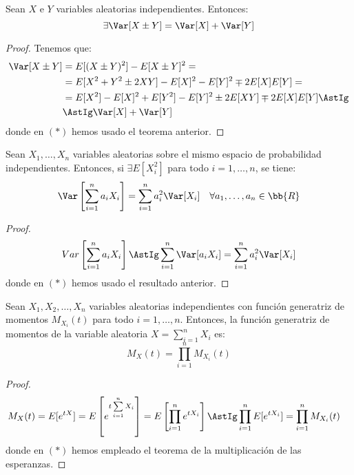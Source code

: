 \begin{coro}
    Sean $X$ e $Y$ variables aleatorias independientes. Entonces:
    \begin{equation*}
        \exists  \Var[X\pm Y] = \Var[X] + \Var[Y]
    \end{equation*}
\end{coro}
\begin{proof}
    Tenemos que:
    \begin{align*}
        \Var[X \pm Y] &= E[(X\pm Y)^2] - E[X\pm Y]^2
        =\\&= E[X^2 + Y^2 \pm 2XY] - E[X]^2 - E[Y]^2 \mp 2E[X]E[Y]
        =\\&= E[X^2] - E[X]^2 + E[Y^2] -E[Y]^2 \pm 2E[XY] \mp 2E[X]E[Y]
        \AstIg\\&\AstIg \Var[X] + \Var[Y]
    \end{align*}
    donde en $(\ast)$ hemos usado el teorema anterior.
\end{proof}

\begin{coro}
    Sean $X_1, \ldots, X_n$ variables aleatorias sobre el mismo espacio de probabilidad independientes. Entonces, si $\exists E[X_i^2]$ para todo $i = 1, \ldots, n$, se tiene:
    \[
        \Var\left[\sum_{i=1}^n a_i X_i\right] = \sum_{i=1}^n a_i^2\Var[X_i] \quad \forall a_1, \ldots, a_n \in \bb{R}
    \]
\end{coro}
\begin{proof}
    \begin{equation*}
        Var\left[\sum_{i=1}^n a_iX_i\right]
        \AstIg \sum_{i=1}^n \Var[a_iX_i]
        = \sum_{i=1}^n a_i^2 \Var[X_i]
    \end{equation*}
    donde en $(\ast)$ hemos usado el resultado anterior.
\end{proof}


\begin{coro}\label{coro:generatriz_momentos_independientes}
    Sean $X_1,X_2,\ldots,X_n$ variables aleatorias independientes con función generatriz de momentos $M_{X_i}(t)$ para todo $i=1,\dots,n$. Entonces, la función generatriz de momentos de la variable aleatoria $X=\sum\limits_{i=1}^n X_i$ es:
    \begin{equation*}
        M_X(t)=\prod_{i=1}^n M_{X_i}(t)
    \end{equation*}
\end{coro}
\begin{proof}
    \begin{equation*}\begin{split}
        M_X(t)
        &= E[e^{tX}]
        = E\left[e^{t\sum\limits_{i=1}^n X_i}\right]
        = E\left[\prod_{i=1}^n e^{tX_i}\right]
        \AstIg \prod_{i=1}^n E[e^{tX_i}]
        = \prod_{i=1}^n M_{X_i}(t)
    \end{split}\end{equation*}
    donde en $(\ast)$ hemos empleado el teorema de la multiplicación de las esperanzas.
\end{proof}


